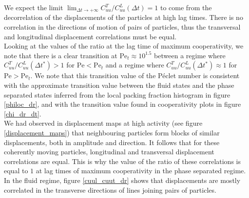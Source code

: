 \documentclass[class=report, float=false, crop=false]{standalone}
\begin{document}
We expect the limit $\lim_{\Delta t \rightarrow +\infty} C_{uu}^T/C_{uu}^L(\Delta t) = 1$ to come from the decorrelation of the displacements of the particles at high lag times. There is no correlation in the directions of motion of pairs of particles, thus the transversal and longitudinal displacement correlations must be equal.\\

Looking at the values of the ratio at the lag time of maximum cooperativity, we note that there is a clear transition at $\text{Pe}_t \approx 10^{1.5}$ between a regime where $C_{uu}^T/C_{uu}^L(\Delta t^*) > 1$ for $\text{Pe} < \text{Pe}_t$ and a regime where $C_{uu}^T/C_{uu}^L(\Delta t^*) \approx 1$ for $\text{Pe} > \text{Pe}_t$. We note that this transition value of the P\'eclet number is consistent with the approximate transition value between the fluid states and the phase separated states inferred from the local packing fraction histogram in figure \ref{philoc_dr}, and with the transition value found in cooperativity plots in figure \ref{chi_dr_dt}.\\

We had observed in displacement maps at high activity (see figure \ref{displacement_maps}) that neighbouring particles form blocks of similar displacements, both in amplitude and direction. It follows that for these coherently moving particles, longitudinal and transversal displacement correlations are equal. This is why the value of the ratio of these correlations is equal to $1$ at lag times of maximum cooperativity in the phase separated regime.\\

In the fluid regime, figure \ref{cuul_cuut_dr} shows that displacements are mostly correlated in the transverse directions of lines joining pairs of particles.
\end{document}
